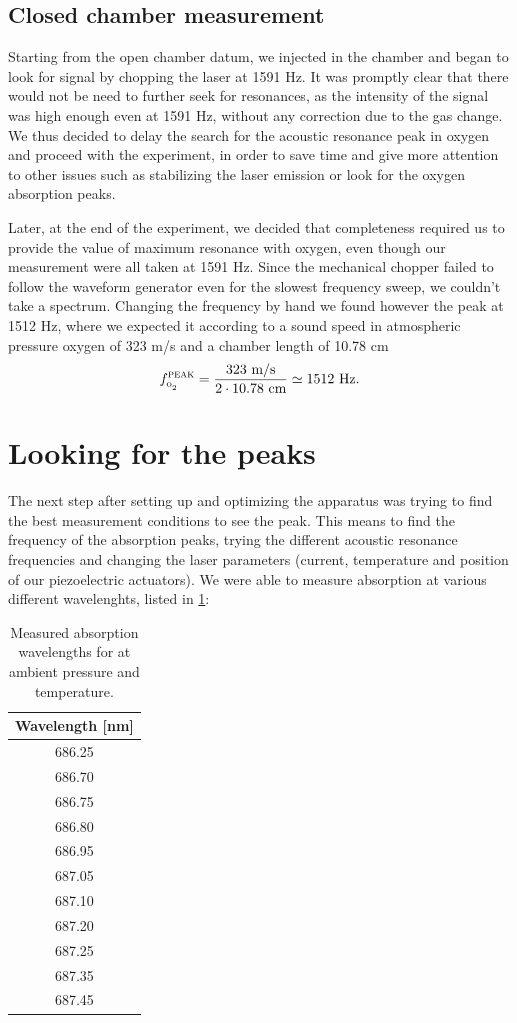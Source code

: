 		\subsection{Closed chamber measurement}
Starting from the open chamber datum, we injected  in the chamber and began to look for signal by chopping the laser at 1591 Hz. It was promptly clear that there would not be need to further seek for resonances, as the intensity of the signal was high enough even at 1591 Hz, without any correction due to the gas change. We thus decided to delay the search for the acoustic resonance peak in oxygen and proceed with the experiment, in order to save time and give more attention to other issues such as stabilizing the laser emission or look for the oxygen absorption peaks.

Later, at the end of the experiment, we decided that completeness required us to provide the value of maximum resonance with oxygen, even though our measurement were all taken at 1591 Hz. Since the mechanical chopper failed to follow the waveform generator even for the slowest frequency sweep, we couldn't take a spectrum. Changing the frequency by hand we found however the peak at 1512 Hz, where we expected it according to a sound speed in atmospheric pressure oxygen of 323 m/s and a chamber length of 10.78 cm$$f^{\mai{peak}}_{\ce{o2}}=\frac{323\mbox{ m/s}}{2\cdot10.78\mbox{ cm}}\simeq1512\mbox{ Hz.}$$

\section{Looking for the \texorpdfstring{}{oxygen} peaks}\label{oxygen}
The next step after setting up and optimizing the apparatus was trying to find the best measurement conditions to see the peak. This means to find the frequency of the  absorption peaks, trying the different acoustic resonance frequencies and changing the laser parameters (current, temperature and position of our piezoelectric actuators). 
We were able to measure absorption at various different wavelenghts, listed in \cref{oxypeaks}:

\begin{table}\centering
\begin{tabular}{|c|}
\hline Wavelength [nm]\\ \hline
686.25 \\ \hline
686.70 \\ \hline
686.75 \\ \hline
686.80 \\ \hline
686.95 \\ \hline
687.05 \\ \hline
687.10 \\ \hline
687.20 \\ \hline
687.25 \\ \hline
687.35 \\ \hline
687.45 \\ \hline
\end{tabular}
\caption{Measured absorption wavelengths for  at ambient pressure and temperature.}
\label{oxypeaks}
\end{table}

